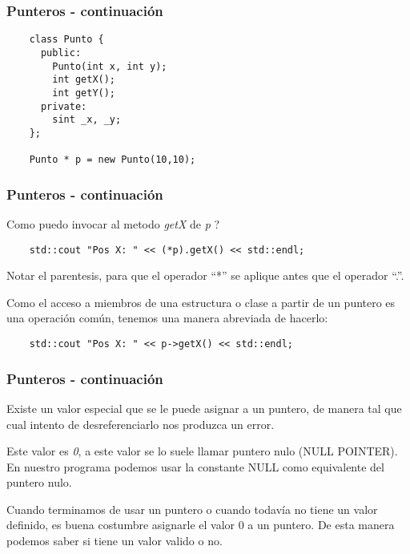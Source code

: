 \documentclass{beamer}
\begin{document}
\begin{frame}[fragile]
\frametitle{Punteros - continuación}

\begin{verbatim}
    class Punto {
      public:
        Punto(int x, int y);
        int getX();
        int getY();
      private:
        sint _x, _y;
    };

    Punto * p = new Punto(10,10);
\end{verbatim}
\end{frame}



\begin{frame}[fragile]
\frametitle{Punteros - continuación}

Como puedo invocar al metodo \emph{getX} de \emph{p} ?

\begin{verbatim}
    std::cout "Pos X: " << (*p).getX() << std::endl;
\end{verbatim}

Notar el parentesis, para que el operador ``*'' se aplique antes que el operador ``.''.


Como el acceso a miembros de una estructura o clase a partir de un puntero es una operación común, tenemos una manera abreviada de hacerlo:

\begin{verbatim}
    std::cout "Pos X: " << p->getX() << std::endl;
\end{verbatim}

\end{frame}


\begin{frame}[fragile]
\frametitle{Punteros - continuación}

Existe un valor especial que se le puede asignar a un puntero, de manera tal que cual intento de desreferenciarlo nos produzca un error.

Este valor es \emph{0}, a este valor se lo suele llamar puntero nulo (NULL POINTER). En nuestro programa podemos usar la constante NULL como
equivalente del puntero nulo.

\begin{block}{}
Cuando terminamos de usar un puntero o cuando todavía no tiene un valor definido, es buena costumbre asignarle el valor 0 a un puntero.
De esta manera podemos saber si tiene un valor valido o no.
\end{block}

\end{frame}
\end{document}
